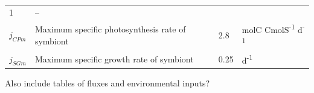 \documentclass[]{elsarticle} %
\begin{document}
\begin{longtable}[c]{@{}llll@{}}
\begin{minipage}[t]{0.09\columnwidth}\raggedright\strut
1
\strut\end{minipage} &
\begin{minipage}[t]{0.23\columnwidth}\raggedright\strut
--
\strut\end{minipage}\tabularnewline
\begin{minipage}[t]{0.10\columnwidth}\raggedright\strut
\(j_{CPm}\)
\strut\end{minipage} &
\begin{minipage}[t]{0.48\columnwidth}\raggedright\strut
Maximum specific photosynthesis rate of symbiont
\strut\end{minipage} &
\begin{minipage}[t]{0.09\columnwidth}\raggedright\strut
2.8
\strut\end{minipage} &
\begin{minipage}[t]{0.23\columnwidth}\raggedright\strut
molC CmolS\textsuperscript{-1} d\textsuperscript{-1}
\strut\end{minipage}\tabularnewline
\begin{minipage}[t]{0.10\columnwidth}\raggedright\strut
\(j_{SGm}\)
\strut\end{minipage} &
\begin{minipage}[t]{0.48\columnwidth}\raggedright\strut
Maximum specific growth rate of symbiont
\strut\end{minipage} &
\begin{minipage}[t]{0.09\columnwidth}\raggedright\strut
0.25
\strut\end{minipage} &
\begin{minipage}[t]{0.23\columnwidth}\raggedright\strut
d\textsuperscript{-1}
\strut\end{minipage}\tabularnewline
\bottomrule
\end{longtable}

Also include tables of fluxes and environmental inputs?
\end{document}
